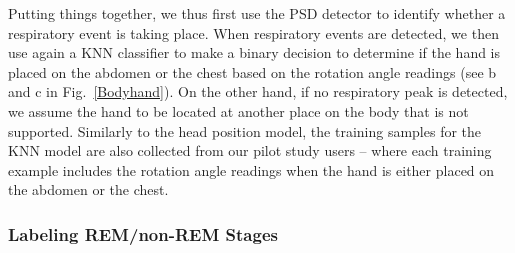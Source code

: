 Putting things together, we thus first use the PSD detector to identify whether a respiratory event is taking place. When respiratory
events are detected, we then use again a KNN classifier to make a binary decision to determine if the hand is placed on the abdomen or the
chest based on the rotation angle readings (see b and c in Fig.~\ref{Bodyhand}). {On the other hand, if no respiratory peak is detected, we
assume the hand to be located at another place on the body that is not supported. } Similarly to the head position model, the training
samples for the KNN model are also collected from our pilot study users -- where each training example includes the rotation angle readings
when the hand is either placed on the abdomen or the chest.

\subsubsection{Labeling REM/non-REM Stages\label{sec:labelrem}}

